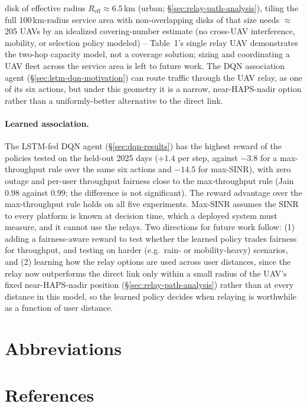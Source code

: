 \documentclass[conference]{IEEEtran}
\begin{document}
disk of effective radius $R_{\text{eff}}\approx6.5$\,km (urban; \S\ref{sec:relay-path-analysis}),
tiling the full 100\,km-radius service area with non-overlapping disks of that size needs
$\approx$205 UAVs by an idealized covering-number estimate (no cross-UAV interference,
mobility, or selection policy modeled) -- Table~1's single relay UAV demonstrates the
two-hop capacity model, not a coverage solution; sizing and coordinating a UAV fleet across
the service area is left to future work.
The DQN association agent (\S\ref{sec:lstm-dqn-motivation}) can route traffic through the UAV relay, as one of its six actions, but under this geometry it is a narrow, near-HAPS-nadir option rather than a uniformly-better alternative to the direct link.

\paragraph{Learned association.} The LSTM-fed DQN agent (\S\ref{sec:dqn-results}) has the highest reward of the policies tested on the held-out 2025 days ($+1.4$ per step, against $-3.8$ for a max-throughput rule over the same six actions and $-14.5$ for max-SINR), with zero outage and per-user throughput fairness close to the max-throughput rule (Jain $0.98$ against $0.99$; the difference is not significant). The reward advantage over the max-throughput rule holds on all five experiments. Max-SINR assumes the SINR to every platform is known at decision time, which a deployed system must measure, and it cannot use the relays. Two
directions for future work follow: (1) adding a fairness-aware reward to test whether the learned policy trades fairness for throughput, and testing on harder (e.g.\ rain- or
mobility-heavy) scenarios, and (2) learning how the relay options are used across user distances, since the relay now outperforms the direct link only within a small radius of the UAV's fixed near-HAPS-nadir position (\S\ref{sec:relay-path-analysis}) rather than at every
distance in this model, so the learned
policy decides when relaying is
worthwhile as a function of user distance.

\section{Abbreviations}



\section{References}


\end{document}
